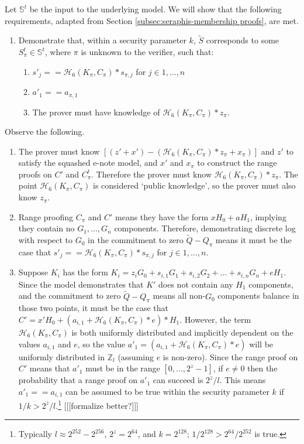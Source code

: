 \begin{appendices}
Let $\mathbb{S}^t$ be the input to the underlying model. We will show that the following requirements, adapted from Section \ref{subsec:seraphis-membership proofs}, are met.

\begin{enumerate}
    \item Demonstrate that, within a security parameter $k$, $\tilde{S}$ corresponds to some $S^t_{\pi} \in \mathbb{S}^t$, where $\pi$ is unknown to the verifier, such that:
    \begin{enumerate}
        \item $s'_j == \mathcal{H}_6(K_{\pi}, C_{\pi})*s_{\pi,j}$ for $j \in 1,...,n$
        \item $a'_1 == a_{\pi,1}$
        \item The prover must have knowledge of $\mathcal{H}_6(K_{\pi}, C_{\pi})*z_{\pi}$.
    \end{enumerate}
\end{enumerate}

Observe the following.

\begin{enumerate}
    \item The prover must know $[(z' + x') - (\mathcal{H}_6(K_{\pi}, C_{\pi})*z_{\pi} + x_{\pi})]$ and $z'$ to satisfy the squashed e-note model, and $x'$ and $x_{\pi}$ to construct the range proofs on $C'$ and $C^t_{\pi}$. Therefore the prover must know $\mathcal{H}_6(K_{\pi}, C_{\pi})*z_{\pi}$. The point $\mathcal{H}_6(K_{\pi}, C_{\pi})$ is considered `public knowledge', so the prover must also know $z_{\pi}$.

    \item Range proofing $C_{\pi}$ and $C'$ means they have the form $x H_0 + a H_1$, implying they contain no $G_1,...,G_n$ components. Therefore, demonstrating discrete log with respect to $G_0$ in the commitment to zero $\tilde{Q} - Q_{\pi}$ means it must be the case that $s'_j == \mathcal{H}_6(K_{\pi}, C_{\pi})*s_{\pi,j}$ for $j \in 1,...,n$.

    \item Suppose $K_i$ has the form $K_i = z_i G_0 + s_{i,1} G_1 + s_{i,2} G_2 + ... + s_{i,n} G_n + e H_1$. Since the model demonstrates that $K'$ does not contain any $H_1$ components, and the commitment to zero $\tilde{Q} - Q_{\pi}$ means all non-$G_0$ components balance in those two points, it must be the case that $C' = x' H_0 + (a_{i,1} + \mathcal{H}_6(K_{\pi}, C_{\pi})*e)*H_1$. However, the term $\mathcal{H}_6(K_{\pi}, C_{\pi})$ is both uniformly distributed and implicitly dependent on the values $a_{i,1}$ and $e$, so the value $a'_1 = (a_{i,1} + \mathcal{H}_6(K_{\pi}, C_{\pi})*e)$ will be uniformly distributed in $\mathbb{Z}_l$ (assuming $e$ is non-zero). Since the range proof on $C'$ means that $a'_1$ must be in the range $[0,...,2^z - 1]$, if $e \neq 0$ then the probability that a range proof on $a'_1$ can succeed is $2^z/l$. This means $a'_1 == a_{i,1}$ can be assumed to be true within the security parameter $k$ if $1/k > 2^z/l$.\footnote{Typically $l \approx 2^{252} - 2^{256}$, $2^z = 2^{64}$, and $k = 2^{128}$; $1/2^{128} > 2^{64}/2^{252}$ is true.} [[[formalize better?]]]
\end{enumerate}


\end{appendices}
